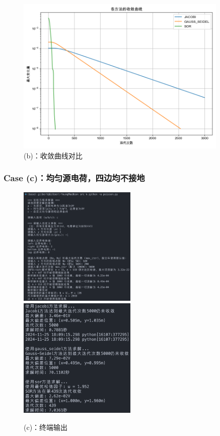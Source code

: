 \begin{figure}[H]
    \centering
    \includegraphics[width=0.9\textwidth]{Problem_1/figs/b_convergence.png}
    \caption{(b)：收敛曲线对比}
\end{figure}

\subsubsection{Case (c)：均匀源电荷，四边均不接地}
\begin{figure}[H]
    \centering
    \includegraphics[width=0.5\textwidth]{Problem_1/figs/c_terminal_1.png}
    \includegraphics[width=0.5\textwidth]{Problem_1/figs/c_terminal_2.png}
    \caption{(c)：终端输出}
\end{figure}

